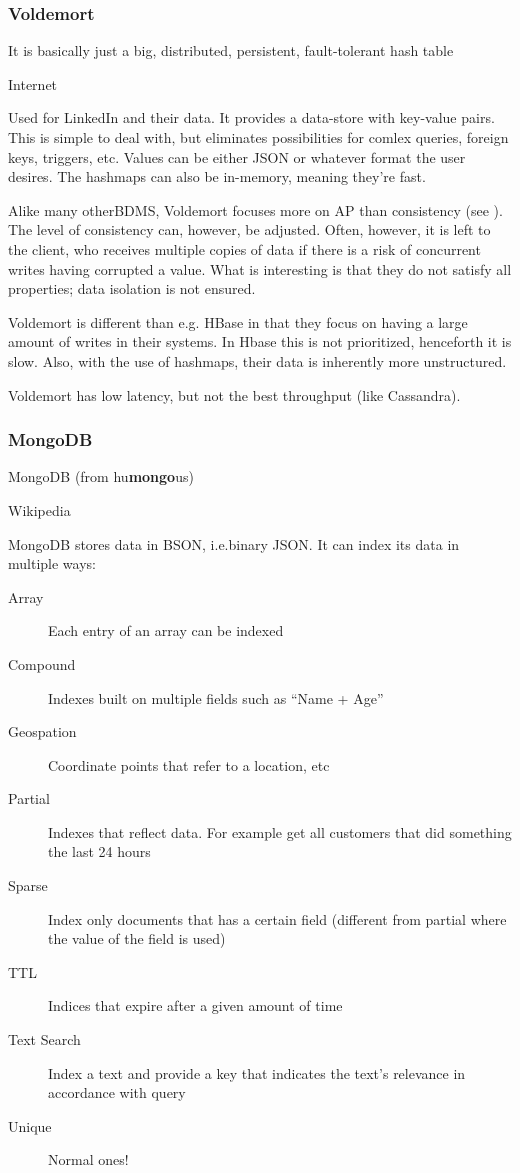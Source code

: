\subsubsection{Voldemort}\label{sec:voldemort}
\epigraph{It is basically just a big, distributed, persistent, fault-tolerant hash table}{Internet}

Used for LinkedIn and their data. It provides a data-store with key-value
pairs. This is simple to deal with, but eliminates possibilities for comlex
queries, foreign keys, triggers, etc.  Values can be either JSON or whatever format the user desires.
The hashmaps can also be in-memory, meaning they're fast.

Alike many otherBDMS, Voldemort focuses more on AP than
consistency (see ). The level of consistency can,
however, be adjusted. Often, however, it is left to the client, who receives multiple
copies of data if there is a risk of concurrent writes having corrupted a value.
What is interesting is that they do not satisfy all
 properties; data isolation is not ensured. 

Voldemort is different than e.g. HBase in that they focus on having a large
amount of writes in their systems.  In Hbase this is not prioritized,
henceforth it is slow. Also, with the use of hashmaps, their data is inherently
more unstructured.

Voldemort has low latency, but not the best throughput (like Cassandra).

\subsubsection{MongoDB}\label{sec:mongodb}
\epigraph{MongoDB (from hu\textbf{mongo}us)}{Wikipedia}

MongoDB stores data in BSON, i.e.\@ binary JSON. It can index its data in multiple ways:
\begin{description}
    \item[Array] Each entry of an array can be indexed
    \item[Compound] Indexes built on multiple fields such as ``Name  + Age''
    \item[Geospation] Coordinate points that refer to a location, etc
    \item[Partial] Indexes that reflect data. For example get all customers that did something the last 24 hours
    \item[Sparse] Index only documents that has a certain field (different from partial where the value of the field is used)
    \item[TTL] Indices that expire after a given amount of time
    \item[Text Search] Index a text and provide a key that indicates the text's relevance in accordance with query
    \item[Unique] Normal ones!
\end{description}

